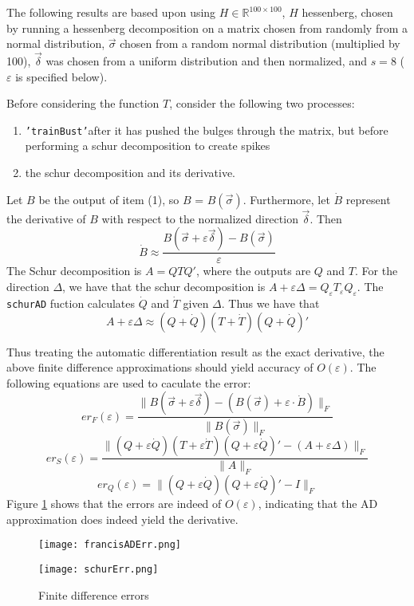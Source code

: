 \documentclass{article}
\newcommand{\tb}{\texttt{'trainBust'}}
\newcommand{\s}{\vec{\sigma}}
\renewcommand{\d}{\vec{\delta}}
\newcommand{\e}{\varepsilon}
\begin{document}
The following results are based upon using $H \in \mathbb{R}^{100\times100}$, $H$ hessenberg,
chosen by running a hessenberg decomposition on a matrix chosen from randomly from a normal distribution,
$\s$ chosen from a random normal distribution (multiplied by 100), $\d$ was chosen
from a uniform distribution and then normalized, and $s = 8$ ($\e$ is specified below).

Before considering the function $T$, consider the following two processes:
\begin{enumerate}
\item \tb after it has pushed the bulges through the matrix, but before performing a schur
decomposition to create spikes
\item the schur decomposition and its derivative.
\end{enumerate}
Let $B$ be the output of item (1), so $B$ = $B(\s)$.
Furthermore, let $\dot{B}$ represent the derivative of $B$ with respect to 
the normalized direction $\d$.
Then
\[
  \dot{B} \approx \dfrac{B(\s + \e\d) - B(\s)}{\e}
\]
The Schur decomposition is $A = QTQ'$, where the outputs are $Q$ and $T$.
For the direction $\Delta$, we have that the schur decomposition is
$A + \e \Delta = Q_{\e} T_{\e} Q_{\e}$.
The \texttt{schurAD} fuction calculates $\dot{Q}$ and $\dot{T}$ given $\Delta$.
Thus we have that
\[
  A + \e \Delta \approx (Q + \dot{Q}) (T + \dot{T}) (Q + \dot{Q})'
\]

Thus treating the automatic differentiation result as the exact derivative,
the above finite difference approximations should yield accuracy of $O(\e)$.
The following equations are used to caculate the error:
\[
  er_F(\e) = \dfrac{\|B(\s + \e \d) - (B(\s) + \e \cdot \dot{B})\|_F}{\|B(\s)\|_F}
\]
\[
  er_S(\e) = \dfrac{
    \|(Q + \e \dot{Q}) (T + \e \dot{T}) (Q + \e \dot{Q})' - (A + \e \Delta)\|_F}
    {\|A\|_F}
\]
\[
  er_Q(\e) = \| (Q + \e\dot{Q})(Q + \e\dot{Q})' - I\|_F
\]
Figure \ref{fig:fdErr} shows that the errors are indeed of $O(\e)$, indicating
that the AD approximation does indeed yield the derivative.

\begin{figure}[h!]
  \centering
  \begin{minipage}[b]{.5\linewidth}
    \centering
    \texttt{[image: francisADErr.png]}
    \subcaption{$er_F(\e)$}
  \end{minipage}%
  \begin{minipage}[b]{.5\linewidth}
    \centering
    \texttt{[image: schurErr.png]}
    \subcaption{$er_S(\e)$ and $er_Q(\e)$}
  \end{minipage}

\caption{Finite difference errors}\label{fig:fdErr}
\end{figure}
\end{document}
